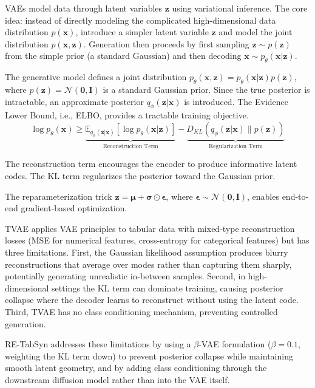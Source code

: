 VAEs \cite{kingma2014vae} model data through latent variables $\mathbf{z}$ using variational inference. The core idea: instead of directly modeling the complicated high-dimensional data distribution $p(\mathbf{x})$, introduce a simpler latent variable $\mathbf{z}$ and model the joint distribution $p(\mathbf{x}, \mathbf{z})$. Generation then proceeds by first sampling $\mathbf{z} \sim p(\mathbf{z})$ from the simple prior (a standard Gaussian) and then decoding $\mathbf{x} \sim p_\theta(\mathbf{x}|\mathbf{z})$.

The generative model defines a joint distribution $p_\theta(\mathbf{x}, \mathbf{z}) = p_\theta(\mathbf{x}|\mathbf{z}) p(\mathbf{z})$, where $p(\mathbf{z}) = \mathcal{N}(\mathbf{0}, \mathbf{I})$ is a standard Gaussian prior. Since the true posterior is intractable, an approximate posterior $q_\phi(\mathbf{z}|\mathbf{x})$ is introduced. The Evidence Lower Bound, i.e., ELBO, provides a tractable training objective.
\begin{equation}
\log p_\theta(\mathbf{x}) \geq \underbrace{\mathbb{E}_{q_\phi(\mathbf{z}|\mathbf{x})}[\log p_\theta(\mathbf{x}|\mathbf{z})]}_{\text{Reconstruction Term}} - \underbrace{D_{KL}(q_\phi(\mathbf{z}|\mathbf{x}) \parallel p(\mathbf{z}))}_{\text{Regularization Term}}
\end{equation}

The reconstruction term encourages the encoder to produce informative latent codes. The KL term regularizes the posterior toward the Gaussian prior.

The reparameterization trick $\mathbf{z} = \boldsymbol{\mu} + \boldsymbol{\sigma} \odot \boldsymbol{\epsilon}$, where $\boldsymbol{\epsilon} \sim \mathcal{N}(\mathbf{0}, \mathbf{I})$, enables end-to-end gradient-based optimization.

TVAE applies VAE principles to tabular data with mixed-type reconstruction losses (MSE for numerical features, cross-entropy for categorical features) but has three limitations. First, the Gaussian likelihood assumption produces blurry reconstructions that average over modes rather than capturing them sharply, potentially generating unrealistic in-between samples. Second, in high-dimensional settings the KL term can dominate training, causing posterior collapse where the decoder learns to reconstruct without using the latent code. Third, TVAE has no class conditioning mechanism, preventing controlled generation.

RE-TabSyn addresses these limitations by using a $\beta$-VAE formulation ($\beta = 0.1$, weighting the KL term down) to prevent posterior collapse while maintaining smooth latent geometry, and by adding class conditioning through the downstream diffusion model rather than into the VAE itself.

